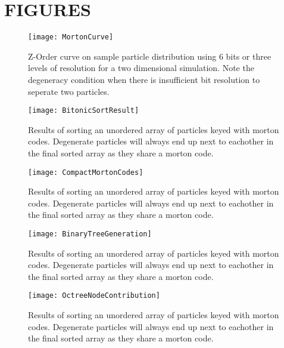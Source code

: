 \documentclass{thesis}
\begin{document}
\chapter{FIGURES}
\begin{figure}[h]
    \caption{Z-Order curve on sample particle distribution using 6 bits or three levels of resolution for a two dimensional simulation.  Note the degeneracy condition when there is insufficient bit resolution to seperate two particles.}
    \label{fig:MortonCurve}
    \centering
    \texttt{[image: MortonCurve]}
\end{figure}
\clearpage
\begin{figure}[h]
    \caption{Results of sorting an unordered array of particles keyed with morton codes. Degenerate particles will always end up next to eachother in the final sorted array as they share a morton code.}
    \label{fig:BitonicSortResult}
    \centering
    \texttt{[image: BitonicSortResult]}
\end{figure}
\clearpage
\begin{sidewaysfigure}[h]
    \label{fig:CompactMortonCodes}
    \centering
    \texttt{[image: CompactMortonCodes]}
    \caption{Results of sorting an unordered array of particles keyed with morton codes. Degenerate particles will always end up next to eachother in the final sorted array as they share a morton code.}
\end{sidewaysfigure}
\clearpage
\begin{sidewaysfigure}[h]
    \label{fig:BinaryTreeGeneration}
    \centering
    \texttt{[image: BinaryTreeGeneration]}
    \caption{Results of sorting an unordered array of particles keyed with morton codes. Degenerate particles will always end up next to eachother in the final sorted array as they share a morton code.}
\end{sidewaysfigure}
\clearpage
\begin{sidewaysfigure}[h]
    \label{fig:OctreeNodeContribution}
    \centering
    \texttt{[image: OctreeNodeContribution]}
    \caption{Results of sorting an unordered array of particles keyed with morton codes. Degenerate particles will always end up next to eachother in the final sorted array as they share a morton code.}
\end{sidewaysfigure}
\end{document}
